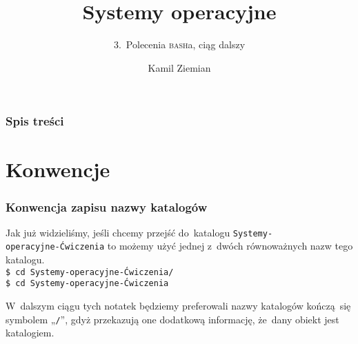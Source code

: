 \documentclass[10pt,t]{beamer}
\title{Systemy operacyjne}
\subtitle{3.~Polecenia \textsc{bash}a, ciąg dalszy}
\author{Kamil Ziemian \\
  \email}
\begin{document}





\RaggedRight





\maketitle





\begin{frame}
  \frametitle{Spis treści}


  \tableofcontents

\end{frame}




















\section{Konwencje}


\begin{frame}
  \frametitle{Konwencja zapisu nazwy katalogów}


  Jak już widzieliśmy, jeśli chcemy przejść do~katalogu \texttt{Systemy-} \\
  \texttt{operacyjne-Ćwiczenia} to możemy użyć jednej z~dwóch
  równoważnych nazw tego katalogu. \\
  \texttt{\$ cd Systemy-operacyjne-Ćwiczenia/} \\
  \texttt{\$ cd Systemy-operacyjne-Ćwiczenia}

  W~dalszym ciągu tych notatek będziemy preferowali nazwy katalogów
  kończą~się symbolem „\texttt{/}”, gdyż przekazują one dodatkową
  informację, że~dany obiekt jest katalogiem.

\end{frame}
\end{document}
